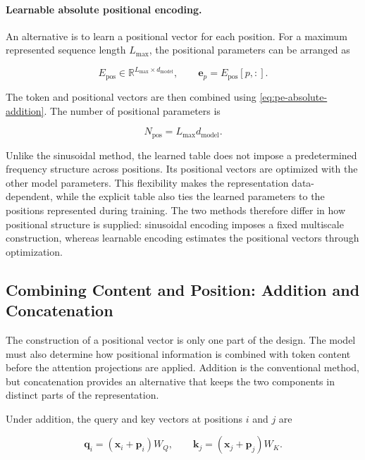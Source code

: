 \paragraph{Learnable absolute positional encoding.}
An alternative is to learn a positional vector for each position. For a
maximum represented sequence length \(L_{\max}\), the positional parameters
can be arranged as

\begin{equation}
    E_{\mathrm{pos}}\in
    \mathbb{R}^{L_{\max}\times d_{\mathrm{model}}},
    \qquad
    \mathbf{e}_p=E_{\mathrm{pos}}[p,:].
    \label{eq:pe-learned-table}
\end{equation}

The token and positional vectors are then combined using
\cref{eq:pe-absolute-addition}. The number of positional parameters is

\begin{equation}
    N_{\mathrm{pos}}=
    L_{\max}d_{\mathrm{model}}.
    \label{eq:pe-learned-parameter-count}
\end{equation}

Unlike the sinusoidal method, the learned table does not impose a
predetermined frequency structure across positions. Its positional vectors
are optimized with the other model parameters. This flexibility makes the
representation data-dependent, while the explicit table also ties the
learned parameters to the positions represented during training. The two
methods therefore differ in how positional structure is supplied: sinusoidal
encoding imposes a fixed multiscale construction, whereas learnable encoding
estimates the positional vectors through optimization.

\subsection{Combining Content and Position: Addition and Concatenation}
\label{subsec:pe-addition-concatenation}

The construction of a positional vector is only one part of the design.
The model must also determine how positional information is combined with
token content before the attention projections are applied. Addition is the
conventional method, but concatenation provides an alternative that keeps
the two components in distinct parts of the representation.

Under addition, the query and key vectors at positions \(i\) and \(j\) are

\begin{equation}
    \mathbf{q}_i=(\mathbf{x}_i+\mathbf{p}_i)W_Q,
    \qquad
    \mathbf{k}_j=(\mathbf{x}_j+\mathbf{p}_j)W_K.
    \label{eq:pe-additive-qk}
\end{equation}

